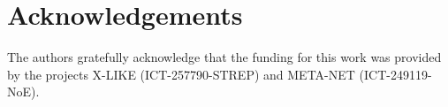 \documentclass{article} %
\begin{document}
\section{Acknowledgements}
The authors gratefully acknowledge that the funding for this work was provided by the projects X-LIKE (ICT-257790-STREP)\cite{xlike} and META-NET (ICT-249119-NoE)\cite{metanet}.

 
%
\end{document}
